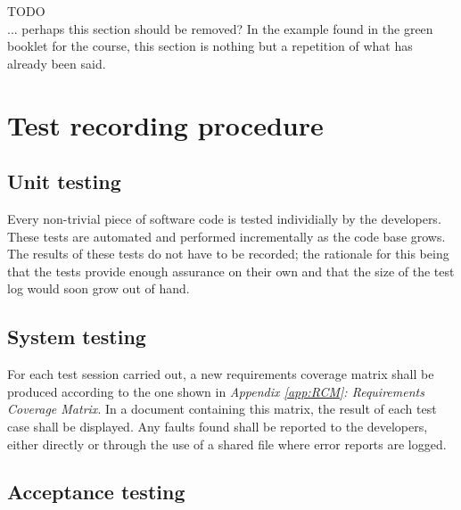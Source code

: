 \documentclass[12pt,titlepage]{article}
\begin{document}
TODO \\

... perhaps this section should be removed? In the example found in the green
booklet for the course, this section is nothing but a repetition of what has
already been said.



\section{Test recording procedure}
\label{sec:test-recording-procedure}

\subsection{Unit testing}
\label{subsec:test-recording-procedure-unit-testing}

Every non-trivial piece of software code is tested individially by the
developers. These tests are automated and performed incrementally as the
code base grows. The results of these tests do not have to be recorded; the
rationale for this being that the tests provide enough assurance on their own
and that the size of the test log would soon grow out of hand.

%
%

\subsection{System testing}
\label{subsec:test-recording-procedure-system-testing}

For each test session carried out, a new requirements coverage matrix shall be
produced according to the one shown in \textit{Appendix \ref{app:RCM}:
Requirements Coverage Matrix}. In a document containing this matrix, the result
of each test case shall be displayed. Any faults found shall be reported to the
developers, either directly or through the use of a shared file where error
reports are logged.

\subsection{Acceptance testing}
\label{subsec:test-recording-procedure-acceptance-testing}
\end{document}
